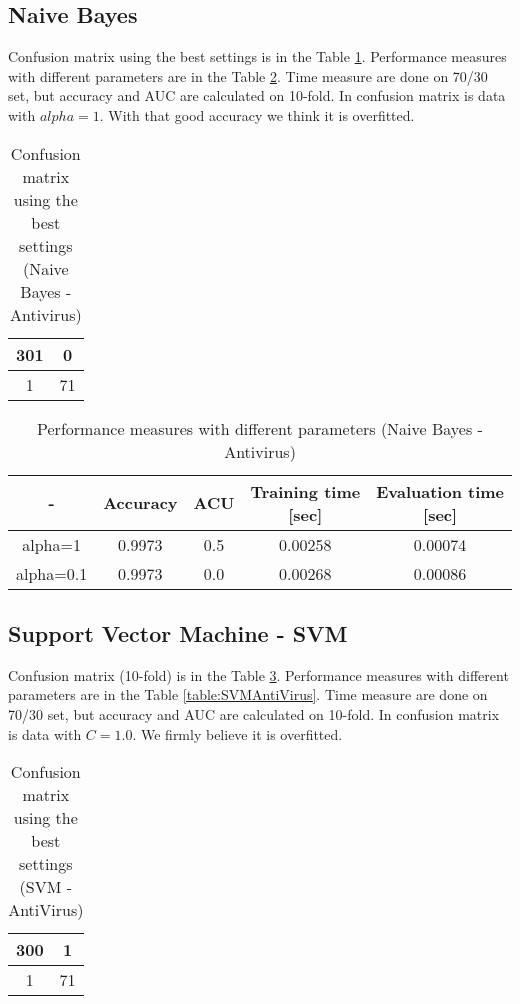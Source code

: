 \documentclass[11pt,a4paper,titlepage]{article}
\begin{document}
\subsection{Naive Bayes}
Confusion matrix using the best settings is in the Table \ref{table:confusionMatrixBayesAntivirus}. Performance measures with different parameters are in the Table \ref{table:BayesAntiVirus}. Time measure are done on 70/30 set, but accuracy and AUC are calculated on 10-fold. In confusion matrix is data with $alpha = 1$. With that good accuracy we think it is overfitted.
\begin{table}
  \centering
  \begin{tabular}{| c | c |}
    \hline
    301 & 0  \\ \hline
    1 & 71 \\
    \hline
  \end{tabular}
  \caption{Confusion matrix using the best settings (Naive Bayes - Antivirus)}
  \label{table:confusionMatrixBayesAntivirus}
  \end{table}
  
  \begin{table}
  \centering
  \begin{tabular}{| c | c | c | c | c |}
    \hline
     		-	   & Accuracy & 	ACU 	& Training time [sec] & Evaluation time [sec] \\ \hline
    alpha=1 &  0.9973	  &     0.5		& 		0.00258			  & 		0.00074 		\\ \hline
    alpha=0.1 & 	0.9973	  & 	0.0		& 		0.00268			  &			0.00086 		\\ \hline

  \end{tabular}
  \caption{Performance measures with different parameters (Naive Bayes - Antivirus)}
  \label{table:BayesAntiVirus}
  \end{table}
  
  
\subsection{Support Vector Machine - SVM}
Confusion matrix (10-fold) is in the Table \ref{table:confusionMatrixSVMAntiVirus}. Performance measures with different parameters are in the Table \ref{table:SVMAntiVirus}. Time measure are done on 70/30 set, but accuracy and AUC are calculated on 10-fold. In confusion matrix is data with $C = 1.0$. We firmly believe it is overfitted.
\begin{table}
  \centering
  \begin{tabular}{| c | c |}
    \hline
   	    300 & 1 \\ \hline
    	1 & 71\\
    \hline
  \end{tabular}
  \caption{Confusion matrix using the best settings (SVM - AntiVirus)}
  \label{table:confusionMatrixSVMAntiVirus}
  \end{table}
  
\end{document}
